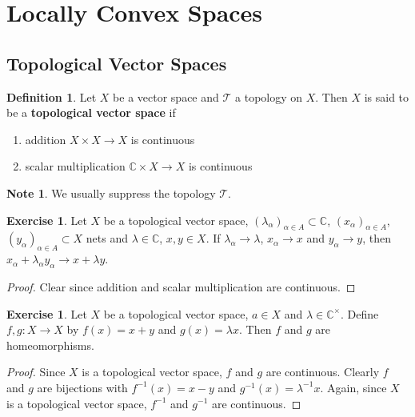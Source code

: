 \documentclass[12pt]{amsart}
\theoremstyle{definition}
\newtheorem{defn}[definition]{Definition}
\newtheorem{note}[definition]{Note}
\newtheorem{ex}[definition]{Exercise}
\newcommand{\al}{\alpha}
\newcommand{\lam}{\lambda}
\newcommand{\C}{\mathbb{C}}
\newcommand{\MT}{\mathcal{T}}
\newcommand{\tbf}[1]{\textbf{#1}}
\DeclareMathOperator*{\0}{\mbf{0}}
\DeclareMathOperator*{\1}{\mbf{1}}
\begin{document}
	\newpage
	\section{Locally Convex Spaces}
	
	\subsection{Topological Vector Spaces}
	
	\begin{defn}
		Let $X$ be a vector space and $\MT$ a topology on $X$. Then $X$ is said to be a \tbf{topological vector space} if
		\begin{enumerate}
			\item  addition $X \times X \rightarrow X$ is continuous  \item scalar multiplication $\C \times X \rightarrow X$ is continuous
		\end{enumerate}
	\end{defn}
	
	\begin{note}
		We usually suppress the topology $\MT$.
	\end{note}

	\begin{ex}
		Let $X$ be a topological vector space, $(\lam_{\al})_{\al \in A} \subset \C$, $(x_{\al})_{\al \in A}$, $(y_{\al})_{\al \in A} \subset X$ nets and $\lam \in \C$, $x, y \in X$. If $\lam_{\al} \rightarrow \lam$, $x_{\al} \rightarrow x$ and $y_{\al} \rightarrow y$, then $x_{\al} + \lam_{\al}y_{\al} \rightarrow x + \lam y$.
	\end{ex}

	\begin{proof}
		Clear since addition and scalar multiplication are continuous.
	\end{proof}
	
	\begin{ex}
		Let $X$ be a topological vector space, $a \in X$ and $\lam \in \C^{\times}$. Define $f,g: X \rightarrow X$ by $f(x) = x + y$ and $g(x) = \lam x$. Then $f$ and $g$ are homeomorphisms. 
	\end{ex}
	
	\begin{proof}
		Since $X$ is a topological vector space, $f$ and $g$ are continuous. Clearly $f$ and $g$ are bijections with $f^{-1}(x) = x - y$ and $g^{-1}(x) = \lam^{-1}x$. Again, since $X$ is a topological vector space, $f^{-1}$ and $g^{-1}$ are continuous.
	\end{proof}
\end{document}

